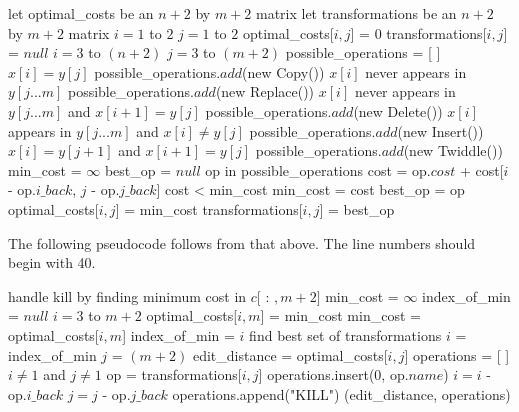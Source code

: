 \documentclass[11pt]{article}
\begin{document}
\begin{codebox}
\li let optimal\_costs be an $n + 2$ by $m + 2$ matrix
\li let transformations be an $n + 2$ by $m + 2$ matrix
\li
\li {}
\li {}
\li \For $i=1$ to $2$ \Do
\li     \For $j=1$ to $2$ \Do
\li         optimal\_costs[$i,j$] = 0
\li         transformations[$i,j$] = $null$
        \End
\li \End
\li {}
\li \For $i=3$ to $(n+2)$ \Do
\li     \For $j=3$ to $(m+2)$ \Do
\li         possible\_operations = [ ]
\li
\li         {}
\li         {}
\li         \If $x[i] = y[j]$ \Then
\li              possible\_operations$.add$(new Copy())
\li         \ElseIf $x[i]$ never appears in $y[j...m]$       \Then
\li              possible\_operations$.add$(new Replace())
\li         \ElseIf $x[i]$ never appears in $y[j...m]$ and $x[i+1] = y[j]$ \Then
\li              possible\_operations$.add$(new Delete())
\li         \ElseIf $x[i]$ appears in $y[j...m]$ and $x[i] \neq y[j]$ \Then
\li              possible\_operations$.add$(new Insert())
\li         \ElseIf $x[i] = y[j+1]$ and $x[i+1] = y[j]$ \Then
\li              possible\_operations$.add$(new Twiddle())
\li         \End
\li         min\_cost = $\infty$
\li         best\_op = $null$
\li
\li         \For op in possible\_operations \Do
\li             cost = op$.cost$ + cost[$i$ - op.$i\_back$, $j$ - op.$j\_back$]
\li             \If cost < min\_cost \Then
\li                 min\_cost = cost
\li                 best\_op = op
                \End
\li         \End
        \End
\li     optimal\_costs[$i,j$] = min\_cost
\li     transformations[$i,j$] = best\_op
    \End
\end{codebox}

\newpage

The following pseudocode follows from that above. The line numbers should begin with 40.

\begin{codebox}
\li \Comment handle kill by finding minimum cost in $c[$ : $,m+2]$
\li min\_cost = $\infty$
\li index\_of\_min = $null$
\li \For $i=3$ to $m+2$ \Do
\li     \If optimal\_costs[$i,m$] = min\_cost \Then
\li         min\_cost = optimal\_costs[$i,m$]
\li         index\_of\_min = $i$
        \End
\li \End
\li \Comment find best set of transformations
\li $i$ = index\_of\_min
\li $j$ = $(m+2)$
\li edit\_distance = optimal\_costs[$i,j$]
\li operations = [ ]
\li \While $i \neq 1$ and $j \neq 1$ \Do
\li     op = transformations[$i,j$]
\li     operations.insert(0, op$.name$)
\li     $i = i$ - op.$i\_back$
\li     $j = j$ - op.$j\_back$
    \End
\li operations.append("KILL")
\li \Return (edit\_distance, operations)
\end{codebox}
\end{document}
